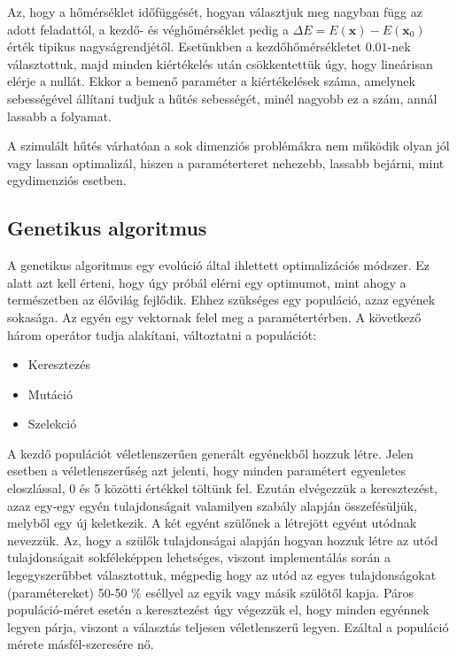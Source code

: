 \documentclass[12pt]{article}
\begin{document}
Az, hogy a hőmérséklet időfüggését, hogyan választjuk meg nagyban függ az adott feladattól, a kezdő- és véghőmérséklet pedig a $\Delta E = E(\mathbf{x}) - E(\mathbf{x}_0)$ érték tipikus nagyságrendjétől. %
Esetünkben a kezdőhőmérsékletet $0.01$-nek választottuk, majd minden kiértékelés után csökkentettük úgy, hogy lineárisan elérje a nullát. Ekkor a bemenő paraméter a kiértékelések száma, amelynek sebességével állítani tudjuk a hűtés sebességét, minél nagyobb ez a szám, annál lassabb a folyamat.

A szimulált hűtés várhatóan a sok dimenziós problémákra nem működik olyan jól vagy lassan optimalizál, hiszen a paraméterteret nehezebb, lassabb bejárni, mint egydimenziós esetben. %

\subsection{Genetikus algoritmus}
A genetikus algoritmus \cite{whitley1994genetic} egy evolúció által ihlettett optimalizációs módszer. Ez alatt azt kell érteni, hogy úgy próbál elérni egy optimumot, mint ahogy a természetben az élővilág fejlődik. Ehhez szükséges egy populáció, azaz egyének sokasága. Az egyén egy vektornak felel meg a paramétertérben. A következő három operátor tudja alakítani, változtatni a populációt:
\begin{itemize}
	\item Keresztezés
	\item Mutáció
	\item Szelekció
\end{itemize}
A kezdő populációt véletlenszerűen generált egyénekből hozzuk létre. Jelen esetben a véletlenszerűség azt jelenti, hogy minden paramétert egyenletes eloszlással,  0 és 5 közötti értékkel töltünk fel. Ezután elvégezzük a keresztezést, azaz egy-egy egyén tulajdonságait valamilyen szabály alapján összefésüljük, melyből egy új keletkezik. A két egyént szülőnek a létrejött egyént utódnak nevezzük. Az, hogy a szülők tulajdonságai alapján hogyan hozzuk létre az utód tulajdonságait sokféleképpen lehetséges, viszont implementálás során a legegyszerűbbet választottuk, mégpedig hogy az utód az egyes tulajdonságokat (paramétereket) 50-50 \% eséllyel az egyik vagy másik szülőtől kapja. Páros populáció-méret esetén a keresztezést úgy végezzük el, hogy minden egyénnek legyen párja, viszont a választás teljesen véletlenszerű legyen. Ezáltal a populáció mérete másfél-szeresére nő.
\end{document}
